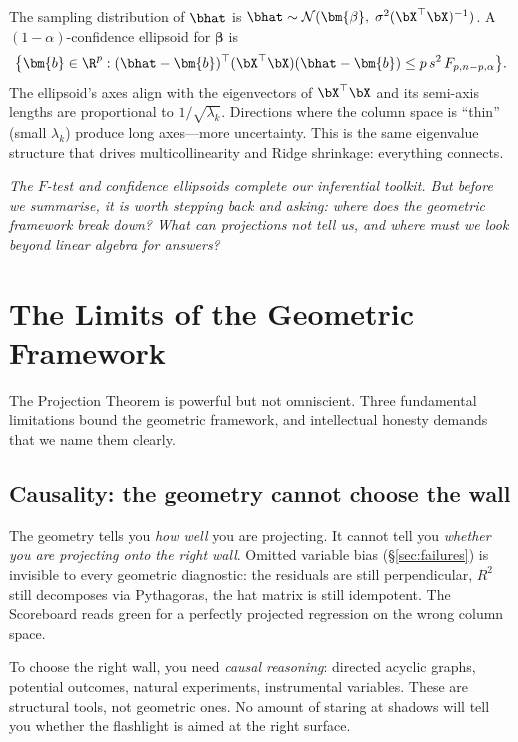 The sampling distribution of $\bhat$ is
$\bhat\sim\mathcal{N}(\bm{\beta},\;\sigma^2(\bX^\top\bX)^{-1})$.
A $(1-\alpha)$-confidence ellipsoid for $\bm{\beta}$ is
\[
  \bigl\{\bm{b}\in\R^p :
  (\bhat-\bm{b})^\top(\bX^\top\bX)(\bhat-\bm{b})
  \le p\,s^2\,F_{p,n-p,\alpha}
  \bigr\}.
\]
The ellipsoid's axes align with the eigenvectors of $\bX^\top\bX$
and its semi-axis lengths are proportional to $1/\sqrt{\lambda_k}$.
Directions where the column space is ``thin'' (small $\lambda_k$)
produce long axes---more uncertainty.
This is the same eigenvalue structure that drives multicollinearity
and Ridge shrinkage: everything connects.

\medskip
\noindent\textit{The $F$-test and confidence ellipsoids complete our
inferential toolkit.
But before we summarise, it is worth stepping back and asking:
where does the geometric framework \emph{break down}?
What can projections not tell us, and where must we look beyond
linear algebra for answers?}


\section{The Limits of the Geometric Framework}\label{sec:limits}

The Projection Theorem is powerful but not omniscient.
Three fundamental limitations bound the geometric framework, and
intellectual honesty demands that we name them clearly.

\subsection{Causality: the geometry cannot choose the wall}

The geometry tells you \emph{how well} you are projecting.
It cannot tell you \emph{whether you are projecting onto the right wall}.
Omitted variable bias (\S\ref{sec:failures}) is invisible to every
geometric diagnostic: the residuals are still perpendicular, $R^2$ still
decomposes via Pythagoras, the hat matrix is still idempotent.
The Scoreboard reads green for a perfectly projected regression on the
wrong column space.

To choose the right wall, you need \emph{causal reasoning}: directed
acyclic graphs, potential outcomes, natural experiments, instrumental
variables. These are structural tools, not geometric ones.
No amount of staring at shadows will tell you whether the flashlight
is aimed at the right surface.

